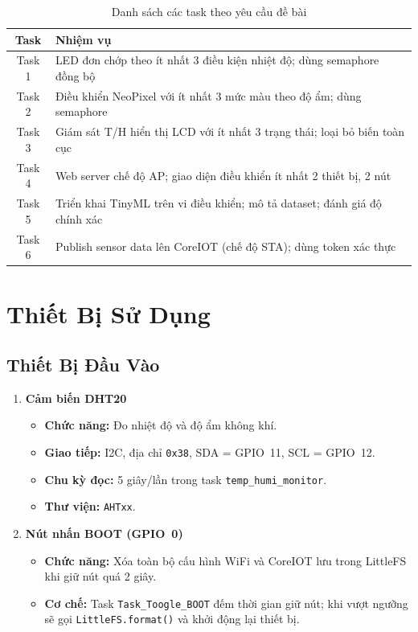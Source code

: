 \documentclass[12pt,a4paper]{article}
\begin{document}
\begin{table}[H]
\centering
\begin{tabular}{|c|p{11cm}|}
\hline
\textbf{Task} & \textbf{Nhiệm vụ} \\
\hline
Task 1 & LED đơn chớp theo ít nhất 3 điều kiện nhiệt độ; dùng semaphore đồng bộ \\
Task 2 & Điều khiển NeoPixel với ít nhất 3 mức màu theo độ ẩm; dùng semaphore \\
Task 3 & Giám sát T/H hiển thị LCD với ít nhất 3 trạng thái; loại bỏ biến toàn cục \\
Task 4 & Web server chế độ AP; giao diện điều khiển ít nhất 2 thiết bị, 2 nút \\
Task 5 & Triển khai TinyML trên vi điều khiển; mô tả dataset; đánh giá độ chính xác \\
Task 6 & Publish sensor data lên CoreIOT (chế độ STA); dùng token xác thực \\
\hline
\end{tabular}
\caption{Danh sách các task theo yêu cầu đề bài}
\end{table}


\section{Thiết Bị Sử Dụng}

\subsection{Thiết Bị Đầu Vào}

\begin{enumerate}
    \item \textbf{Cảm biến DHT20}
    \begin{itemize}
        \item \textbf{Chức năng:} Đo nhiệt độ và độ ẩm không khí.
        \item \textbf{Giao tiếp:} I2C, địa chỉ \texttt{0x38}, SDA = GPIO~11, SCL = GPIO~12.
        \item \textbf{Chu kỳ đọc:} 5 giây/lần trong task \texttt{temp\_humi\_monitor}.
        \item \textbf{Thư viện:} \texttt{AHTxx}.
    \end{itemize}

    \item \textbf{Nút nhấn BOOT (GPIO~0)}
    \begin{itemize}
        \item \textbf{Chức năng:} Xóa toàn bộ cấu hình WiFi và CoreIOT lưu trong LittleFS khi giữ nút quá 2 giây.
        \item \textbf{Cơ chế:} Task \texttt{Task\_Toogle\_BOOT} đếm thời gian giữ nút; khi vượt ngưỡng sẽ gọi \texttt{LittleFS.format()} và khởi động lại thiết bị.
    \end{itemize}
\end{enumerate}
\end{document}
